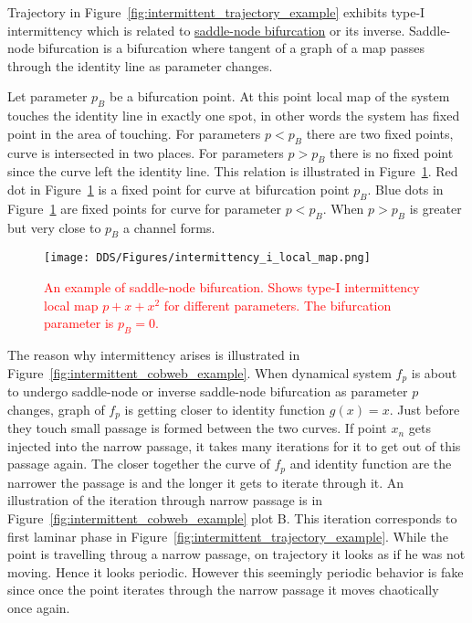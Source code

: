 Trajectory in Figure~\ref{fig:intermittent_trajectory_example} exhibits type-I intermittency which is related to \hyperref[def:saddle_node_bif]{saddle-node bifurcation} or its inverse.
Saddle-node bifurcation is a bifurcation where tangent of a graph of a map passes through the identity line as parameter changes.
\par
Let parameter $p_{B}$ be a bifurcation point.
At this point local map of the system touches the identity line in exactly one spot, in other words the system has fixed point in the area of touching.
For parameters $p < p_{B}$ there are two fixed points, curve is intersected in two places.
For parameters $p > p_{B}$ there is no fixed point since the curve left the identity line.
This relation is illustrated in Figure~\ref{fig:saddle_node_bifurcation}.
Red dot in Figure~\ref{fig:saddle_node_bifurcation} is a fixed point for curve at bifurcation point $p_{B}$.
Blue dots in Figure~\ref{fig:saddle_node_bifurcation} are fixed points for curve for parameter $p < p_{B}$.
When $p > p_{B}$ is greater but very close to $p_{B}$ a channel forms.
\begin{figure}[!h]
    \centering
    \texttt{[image: DDS/Figures/intermittency\_i\_local\_map.png]}
    \caption{
        \textcolor{red}{
        An example of saddle-node bifurcation. 
        Shows type-I intermittency local map $p + x + x^2$ for different parameters. 
        The bifurcation parameter is $p_B = 0$.
        }
    }
    \label{fig:saddle_node_bifurcation}
\end{figure}


The reason why intermittency arises is illustrated in Figure~\ref{fig:intermittent_cobweb_example}.
When dynamical system $f_p$ is about to undergo saddle-node or inverse saddle-node bifurcation as parameter $p$ changes, graph of $f_p$ is getting closer to identity function $g(x)=x$.
Just before they touch small passage is formed between the two curves.
If point $x_n$ gets injected into the narrow passage, it takes many iterations for it to get out of this passage again.
The closer together the curve of $f_p$ and identity function are the narrower the passage is and the longer it gets to iterate through it.
An illustration of the iteration through narrow passage is in Figure~\ref{fig:intermittent_cobweb_example} plot B.
This iteration corresponds to first laminar phase in Figure~\ref{fig:intermittent_trajectory_example}.
While the point is travelling throug a narrow passage, on trajectory it looks as if he was not moving.
Hence it looks periodic.
However this seemingly periodic behavior is fake since once the point iterates through the narrow passage it moves chaotically once again.

